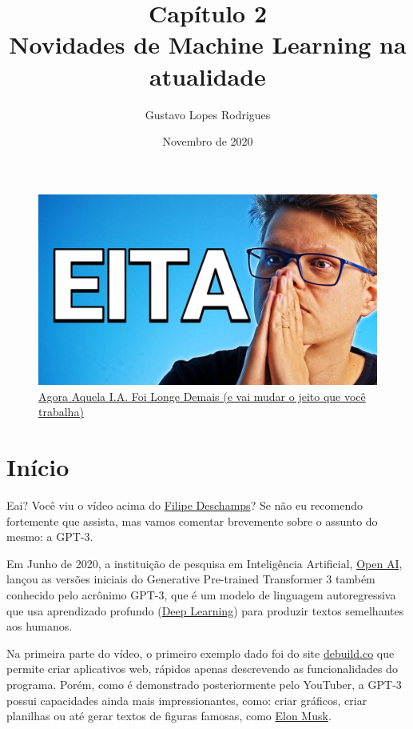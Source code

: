 \documentclass{article}
\title{\textbf{Capítulo 2 \\ Novidades de Machine Learning na atualidade}}
\author{Gustavo Lopes Rodrigues}
\date{Novembro de 2020}
\begin{document}
    
    \maketitle

    \Large

    \begin{figure}[htp]
        \centering
        \includegraphics[scale=0.3]{maxresdefault.jpg}
        \caption{\href{https://youtu.be/pbVwH8o837A}{Agora Aquela I.A. Foi Longe Demais (e vai mudar o jeito que você trabalha)}}
    \end{figure}
    
    \section{Início}

    Eai? Você viu o vídeo acima do \href{https://br.linkedin.com/in/filipedeschamps}{Filipe Deschamps}? 
    Se não eu recomendo fortemente que assista, mas vamos comentar brevemente sobre o assunto 
    do mesmo: a GPT-3.

    Em Junho de 2020, a instituição de pesquisa em Inteligência Artificial,
    \href{https://openai.com/}{Open AI}, lançou as versões iniciais do Generative Pre-trained Transformer 3 também conhecido 
    pelo acrônimo GPT-3, que é um modelo de linguagem autoregressiva que usa 
    aprendizado profundo (\href{https://www.sas.com/pt_br/insights/analytics/deep-learning.html}
    {Deep Learning}) para produzir textos semelhantes aos humanos.

    Na primeira parte do vídeo, o primeiro exemplo dado foi do site \href{https://debuild.co/}{debuild.co} 
    que permite criar aplicativos web, rápidos apenas descrevendo as funcionalidades do programa. 
    Porém, como é demonstrado posteriormente pelo YouTuber, a GPT-3 possui capacidades ainda mais 
    impressionantes, como: criar gráficos, criar planilhas ou até gerar textos de 
    figuras famosas, como \href{https://pt.wikipedia.org/wiki/Elon_Musk}{Elon Musk}.
\end{document}
